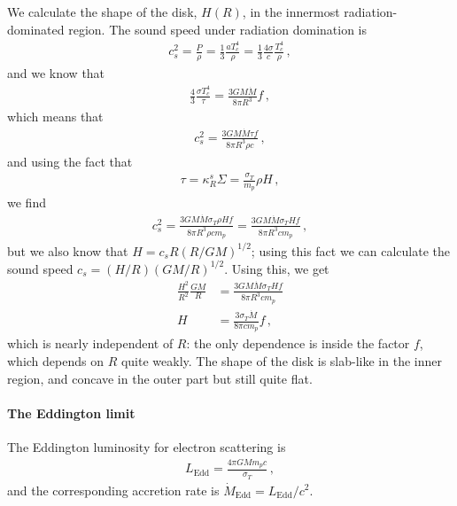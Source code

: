 \documentclass[main.tex]{subfiles}
\begin{document}
We calculate the shape of the disk, \(H(R)\), in the innermost radiation-dominated region.
The sound speed under radiation domination is
%
\begin{align}
c_s^2 = \frac{P}{\rho } = \frac{1}{3} \frac{a T_c^{4}}{\rho} = \frac{1}{3} \frac{4 \sigma }{c} \frac{T_c^{4}}{\rho }
\,,
\end{align}
%
and we know that 
%
\begin{align}
\frac{4}{3} \frac{\sigma T_c^{4}}{\tau } = \frac{3 GM \dot{M}}{8 \pi R^3} f
\,,
\end{align}
%
which means that 
%
\begin{align}
c_s^2 = \frac{3 GM \dot{M} \tau f}{8 \pi R^3 \rho c}
\,,
\end{align}
%
and using the fact that 
%
\begin{align}
\tau = \kappa _R^{s} \Sigma = \frac{\sigma _T}{m_p} \rho H
\,,
\end{align}
%
we find 
%
\begin{align}
c_s^2 =  
\frac{3 GM \dot{M} \sigma _T \rho H f}{8 \pi R^3 \rho  c m_p} =
\frac{3 GM \dot{M} \sigma _T  H f}{8 \pi R^3   c m_p}
\,,
\end{align}
%
but we also know that \(H = c_s R (R / GM)^{1/2}\); using this fact we can calculate the sound speed \(c_s = (H/R)(GM/R)^{1/2} \). 
Using this, we get 
%
\begin{align}
\frac{H^2}{R^2} \frac{GM}{R} &= \frac{3 GM \dot{M} \sigma _T  H f}{8 \pi R^3   c m_p} \\
H &= \frac{3 \sigma _T \dot{M} }{8 \pi c m_p}f 
\,,
\end{align}
%
which is nearly independent of \(R\): the only dependence is inside the factor \(f\), which depends on \(R\) quite weakly. 
The shape of the disk is slab-like in the inner region, and concave in the outer part but still quite flat. 

\paragraph{The Eddington limit}

The Eddington luminosity for electron scattering is 
%
\begin{align}
L _{\text{Edd}} = \frac{4 \pi G M m_p c}{\sigma _T}
\,,
\end{align}
%
and the corresponding accretion rate is \(\dot{M} _{\text{Edd}} = L _{\text{Edd}} / c^2\). 
\end{document}
